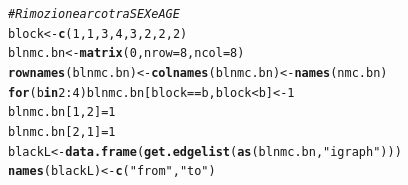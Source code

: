 \documentclass{article}\usepackage[]{graphicx}\usepackage[]{xcolor}
\makeatletter
\newcommand{\hlnum}[1]{\textcolor[rgb]{0.686,0.059,0.569}{#1}}%
\newcommand{\hlstr}[1]{\textcolor[rgb]{0.192,0.494,0.8}{#1}}%
\newcommand{\hlcom}[1]{\textcolor[rgb]{0.678,0.584,0.686}{\textit{#1}}}%
\newcommand{\hlopt}[1]{\textcolor[rgb]{0,0,0}{#1}}%
\newcommand{\hlstd}[1]{\textcolor[rgb]{0.345,0.345,0.345}{#1}}%
\newcommand{\hlkwa}[1]{\textcolor[rgb]{0.161,0.373,0.58}{\textbf{#1}}}%
\newcommand{\hlkwb}[1]{\textcolor[rgb]{0.69,0.353,0.396}{#1}}%
\newcommand{\hlkwc}[1]{\textcolor[rgb]{0.333,0.667,0.333}{#1}}%
\newcommand{\hlkwd}[1]{\textcolor[rgb]{0.737,0.353,0.396}{\textbf{#1}}}%
\newenvironment{kframe}{%
 \def\at@end@of@kframe{}%
 \ifinner\ifhmode%
  \def\at@end@of@kframe{\end{minipage}}%
  \begin{minipage}{\columnwidth}%
 \fi\fi%
 \def\FrameCommand##1{\hskip\@totalleftmargin \hskip-\fboxsep
 \colorbox{shadecolor}{##1}\hskip-\fboxsep
     \hskip-\linewidth \hskip-\@totalleftmargin \hskip\columnwidth}%
 \MakeFramed {\advance\hsize-\width
   \@totalleftmargin\z@ \linewidth\hsize
   \@setminipage}}%
 {\par\unskip\endMakeFramed%
 \at@end@of@kframe}
\newenvironment{knitrout}{}{} %
\makeatother
\begin{document}
\begin{knitrout}
\color{fgcolor}\begin{kframe}
\begin{alltt}
\hlcom{#Rimozione arco tra SEX e AGE}
\hlstd{block}\hlkwb{<-}\hlkwd{c}\hlstd{(}\hlnum{1}\hlstd{,} \hlnum{1}\hlstd{,} \hlnum{3}\hlstd{,} \hlnum{4}\hlstd{,} \hlnum{3}\hlstd{,} \hlnum{2}\hlstd{,} \hlnum{2}\hlstd{,} \hlnum{2}\hlstd{)}
\hlstd{blnmc.bn} \hlkwb{<-} \hlkwd{matrix}\hlstd{(}\hlnum{0}\hlstd{,} \hlkwc{nrow}\hlstd{=}\hlnum{8}\hlstd{,} \hlkwc{ncol}\hlstd{=}\hlnum{8}\hlstd{)}
\hlkwd{rownames}\hlstd{(blnmc.bn)} \hlkwb{<-} \hlkwd{colnames}\hlstd{(blnmc.bn)} \hlkwb{<-} \hlkwd{names}\hlstd{(nmc.bn)}
\hlkwa{for} \hlstd{(b} \hlkwa{in} \hlnum{2}\hlopt{:}\hlnum{4}\hlstd{) blnmc.bn[block}\hlopt{==}\hlstd{b, block}\hlopt{<}\hlstd{b]} \hlkwb{<-} \hlnum{1}
\hlstd{blnmc.bn[}\hlnum{1}\hlstd{,}\hlnum{2}\hlstd{]} \hlkwb{=} \hlnum{1}
\hlstd{blnmc.bn[}\hlnum{2}\hlstd{,}\hlnum{1}\hlstd{]} \hlkwb{=} \hlnum{1}
\hlstd{blackL} \hlkwb{<-} \hlkwd{data.frame}\hlstd{(}\hlkwd{get.edgelist}\hlstd{(}\hlkwd{as}\hlstd{(blnmc.bn,} \hlstr{"igraph"}\hlstd{)))}
\hlkwd{names}\hlstd{(blackL)} \hlkwb{<-} \hlkwd{c}\hlstd{(}\hlstr{"from"}\hlstd{,} \hlstr{"to"}\hlstd{)}
\end{alltt}
\end{kframe}
\end{knitrout}
  
\end{document}
